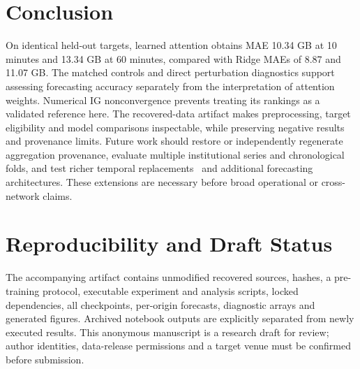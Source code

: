 \documentclass[conference]{IEEEtran}
\begin{document}
\section{Conclusion}
On identical held-out targets, learned attention obtains MAE 10.34 GB at 10 minutes and 13.34 GB at 60 minutes, compared with Ridge MAEs of 8.87 and 11.07 GB. The matched controls and direct perturbation diagnostics support assessing forecasting accuracy separately from the interpretation of attention weights. Numerical IG nonconvergence prevents treating its rankings as a validated reference here. The recovered-data artifact makes preprocessing, target eligibility and model comparisons inspectable, while preserving negative results and provenance limits. Future work should restore or independently regenerate aggregation provenance, evaluate multiple institutional series and chronological folds, and test richer temporal replacements~\cite{learned_perturbations,timing} and additional forecasting architectures. These extensions are necessary before broad operational or cross-network claims.

\section*{Reproducibility and Draft Status}
The accompanying artifact contains unmodified recovered sources, hashes, a pre-training protocol, executable experiment and analysis scripts, locked dependencies, all checkpoints, per-origin forecasts, diagnostic arrays and generated figures. Archived notebook outputs are explicitly separated from newly executed results. This anonymous manuscript is a research draft for review; author identities, data-release permissions and a target venue must be confirmed before submission.
\end{document}
